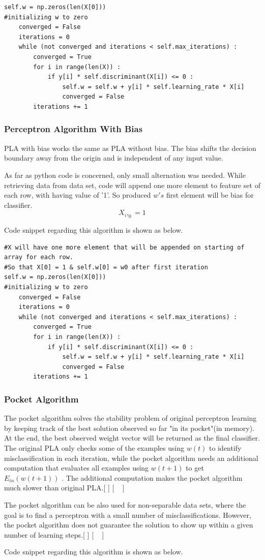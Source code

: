 \documentclass{article}
\begin{document}
\begin{lstlisting}
self.w = np.zeros(len(X[0]))
#initializing w to zero
    converged = False
    iterations = 0
    while (not converged and iterations < self.max_iterations) :
        converged = True
        for i in range(len(X)) :
            if y[i] * self.discriminant(X[i]) <= 0 :
                self.w = self.w + y[i] * self.learning_rate * X[i]
                converged = False
        iterations += 1
\end{lstlisting}
\subsubsection{Perceptron Algorithm With Bias}
PLA with bias works the same as PLA without bias. The bias shifts the decision boundary away from the origin and is independent of any input value.
\par As far as python code is concerned, only small alternation was needed. While retrieving data from data set, code will append one more element to feature set of each row, with having value of '1'. So produced \(w's\) first element will be bias for classifier. 
\begin{equation}
X_i,_0 = 1
\end{equation}
\par Code snippet regarding this algorithm is shown as below.
\begin{lstlisting}
#X will have one more element that will be appended on starting of array for each row.
#So that X[0] = 1 & self.w[0] = w0 after first iteration
self.w = np.zeros(len(X[0]))
#initializing w to zero
    converged = False
    iterations = 0
    while (not converged and iterations < self.max_iterations) :
        converged = True
        for i in range(len(X)) :
            if y[i] * self.discriminant(X[i]) <= 0 :
                self.w = self.w + y[i] * self.learning_rate * X[i]
                converged = False
        iterations += 1
\end{lstlisting}
\subsubsection{Pocket Algorithm}
The pocket algorithm solves the stability problem of original perceptron learning by keeping track of the best solution observed so far "in its pocket"(in memory). At the end, the best observed weight vector will be returned as the final classifier. The original PLA only checks some of the examples using \(w(t)\) to identify misclassification in each iteration, while the pocket algorithm needs an additional computation that evaluates all examples using \(w(t+1)\) to get \(E_{in}(w(t+1))\) . The additional computation makes the pocket algorithm much slower than original PLA.[ \cite{Book1} ] [ ~\citep{Online1} ]
\par The pocket algorithm can be also used for non-separable data sets, where the goal is to find a perceptron with a small number of misclassifications. However, the pocket algorithm does not guarantee the solution to show up within a given number of learning steps.[ \cite{Book1} ] [ ~\citep{Online1} ]
\par Code snippet regarding this algorithm is shown as below.
\end{document}
